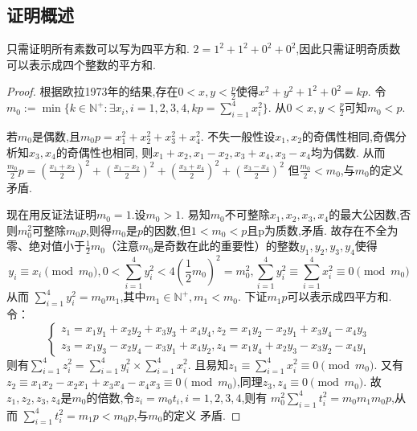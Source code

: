 \documentclass[main]{subfiles}
\begin{document}
\subsection{证明概述}
只需证明所有素数可以写为四平方和.
\(2=1^2 + 1^2 + 0^2 + 0^2\),因此只需证明奇质数可以表示成四个整数的平方和.
\begin{proof}
	根据欧拉1973年的结果,存在\(0<x,y<\frac{p}{2} \)使得\(x^2 + y^2 + 1^2 + 0^2=kp\).
	令\(m_0:=\min\{k \in \mathbb{N}^+:\exists x_i,i=1,2,3,4,kp=\sum_{i=1}^{4}x_i^2\}\).
	从\(0<x,y<\frac{p}{2}\)可知\(m_0 < p\).

	若\(m_0\)是偶数,且\(m_0 p = x_1^2 + x_2^2 + x_3^2 + x_4^2\).
	不失一般性设\(x_1,x_2\)的奇偶性相同,奇偶分析知\(x_3,x_4\)的奇偶性也相同,
	则\(x_1+x_2,x_1-x_2,x_3+x_4,x_3-x_4\)均为偶数.
	从而\(\frac{m_0}{2}p = \left(\frac{x_1+x_2}{2}\right)^2 + \left(\frac{x_1-x_2}{2}\right)^2 + \left(\frac{x_3+x_4}{2}\right)^2 + \left(\frac{x_3-x_4}{2}\right)^2\)
	但\(\frac{m_0}{2} < m_0\),与\(m_0\)的定义矛盾.

	现在用反证法证明\(m_0 = 1\).设\(m_0 > 1\).
	易知\(m_0\)不可整除\(x_1,x_2,x_3,x_4\)的最大公因数,否则\(m_0^2\)可整除\(m_0 p\),则得\(m_0\)是\(p\)的因数,但\(1 < m_0 < p\)且p为质数,矛盾.
	故存在不全为零、绝对值小于\(\frac{1}{2} m_0\)（注意\(m_0\)是奇数在此的重要性）的整数\(y_1,y_2,y_3,y_4\)使得
	\[
		y_i \equiv x_i \pmod{m_0},0 < \sum_{i=1}^{4} y_i^2 < 4 (\frac{1}{2} m_0 )^2 = m_0^2 ,\sum_{i=1}^{4} y_i^2 \equiv \sum_{i=1}^{4} x_i^2 \equiv 0 \pmod{m_0}
	\]
	从而 \(\sum_{i=1}^{4} y_i^2  = m_0 m_1\),其中\(m_1 \in \mathbb{N}^+,m_1 < m_0\).
	下证\(m_1 p\)可以表示成四平方和.
	令：
	\[
		\begin{cases}
			z_1=x_1 y_1 + x_2 y_2 + x_3 y_3 + x_4 y_4,z_2 = x_1 y_2 - x_2 y_1 + x_3 y_4 - x_4 y_3 \\
			z_3 = x_1 y_3 - x_2 y_4 -x_3 y_1 + x_4 y_2,z_4 = x_1 y_4 + x_2 y_3 -x_3 y_2 -x_4 y_1
		\end{cases}
	\]
	则有\(\sum_{i=1}^{4} z_i^2 = \sum_{i=1}^{4} y_i^2 \times \sum_{i=1}^{4} x_i^2\).
	且易知\(z_1 \equiv \sum_{i=1}^{4}x_i^2 \equiv 0 \pmod{m_0}\).
	又有\(z_2 \equiv x_1 x_2 - x_2 x_1 +x_3 x_4 - x_4 x_3 \equiv 0 \pmod{m_0}\),同理\(z_3,z_4 \equiv 0 \pmod{m_0}\).
	故\(z_1,z_2,z_3,z_4\)是\(m_0\)的倍数,令\(z_i = m_0 t_i,i=1,2,3,4\),则有
	\(m_0^2 \sum_{i=1}^{4} t_i^2 = m_0 m_1 m_0 p\),从而
	\(\sum_{i=1}^{4} t_i^2 = m_1 p < m_0 p\),与\(m_0\)的定义
	矛盾.
\end{proof}
\end{document}

